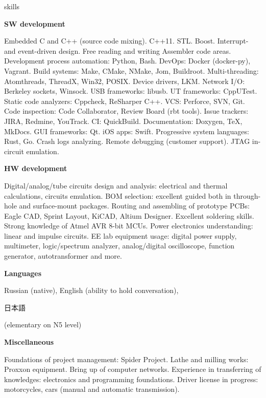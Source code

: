 \documentclass{template}
\begin{document}
\begin{rSection}{skills}
\begin{rItemize}

\item \textbf{SW development}

      Embedded C and C++ (source code mixing). C++11. STL. Boost. Interrupt- and event-driven design. Free reading and writing Assembler code
      areas. Development process automation: Python, Bash. DevOps: Docker (docker-py), Vagrant. Build systems: Make, CMake, NMake, Jom, Buildroot.
      Multi-threading: Atomthreads, ThreadX, Win32, POSIX. Device drivers, LKM. Network I/O: Berkeley sockets, Winsock. USB frameworks: libusb. UT
      frameworks: CppUTest. Static code analyzers: Cppcheck, ReSharper C++. VCS: Perforce, SVN, Git. Code inspection: Code Collaborator, Review
      Board (rbt tools). Issue trackers: JIRA, Redmine, YouTrack. CI: QuickBuild. Documentation: Doxygen, \TeX, MkDocs. GUI frameworks: Qt. iOS
      apps: Swift. Progressive system languages: Rust, Go. Crash logs analyzing. Remote debugging (customer support). JTAG in-circuit emulation.

\item \textbf{HW development}

      Digital/analog/tube circuits design and analysis: electrical and thermal calculations, circuits emulation. BOM selection: excellent guided
      both in through-hole and surface-mount packages. Routing and assembling of prototype PCBs: Eagle CAD, Sprint Layout, KiCAD,
      Altium Designer. Excellent soldering skills. Strong knowledge of Atmel AVR 8-bit MCUs. Power electronics understanding: linear and
      impulse circuits. EE lab equipment usage: digital power supply, multimeter, logic/spectrum analyzer, analog/digital oscilloscope, function
      generator, autotransformer and more.

\item \textbf{Languages}

      Russian (native), English (ability to hold conversation), \begin{CJK}{UTF8}{min}日本語\end{CJK} (elementary on N5 level)

\item \textbf{Miscellaneous}

      Foundations of project management: Spider Project. Lathe and milling works: Proxxon equipment. Bring up of computer networks. Experience in
      transferring of knowledges: electronics and programming foundations. Driver license in progress: motorcycles, cars (manual and automatic
      transmission).

\end{rItemize}
\end{rSection}
\end{document}
